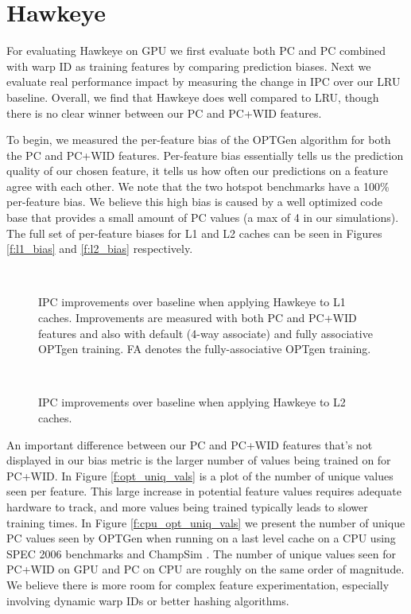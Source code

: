 \section{Hawkeye}
For evaluating Hawkeye on GPU we first evaluate both PC and PC combined with warp ID as training features by comparing prediction biases. Next we evaluate real performance impact by measuring the change in IPC over our LRU baseline. Overall, we find that Hawkeye does well compared to LRU, though there is no clear winner between our PC and PC+WID features.

To begin, we measured the per-feature bias of the OPTGen algorithm for both the PC and PC+WID features. Per-feature bias essentially tells us the prediction quality of our chosen feature, it tells us how often our predictions on a feature agree with each other. We note that the two hotspot benchmarks have a 100\% per-feature bias. We believe this high bias is caused by a well optimized code base that provides a small amount of PC values (a max of 4 in our simulations). The full set of per-feature biases for L1 and L2 caches can be seen in Figures \ref{f:l1_bias} and \ref{f:l2_bias} respectively.

\begin{figure}[htb]
\begin{center}
\ 
\caption{IPC improvements over baseline when applying Hawkeye to L1 caches. Improvements are measured with both PC and PC+WID features and also with default (4-way associate) and fully associative OPTgen training. FA denotes the fully-associative OPTgen training.}
\label{f:l1_ipc}
\end{center}
\end{figure}

\begin{figure}[htb]
\begin{center}
\ 
\caption{IPC improvements over baseline when applying Hawkeye to L2 caches.}
\label{f:l2_ipc}
\end{center}
\end{figure}

An important difference between our PC and PC+WID features that's not displayed in our bias metric is the larger number of values being trained on for PC+WID. In Figure \ref{f:opt_uniq_vals} is a plot of the number of unique values seen per feature. This large increase in potential feature values requires adequate hardware to track, and more values being trained typically leads to slower training times. In Figure \ref{f:cpu_opt_uniq_vals} we present the number of unique PC values seen by OPTGen when running on a last level cache on a CPU using SPEC 2006 \cite{spec} benchmarks and ChampSim \cite{champsim}. The number of unique values seen for PC+WID on GPU and PC on CPU are roughly on the same order of magnitude. We believe there is more room for complex feature experimentation, especially involving dynamic warp IDs or better hashing algorithms.

